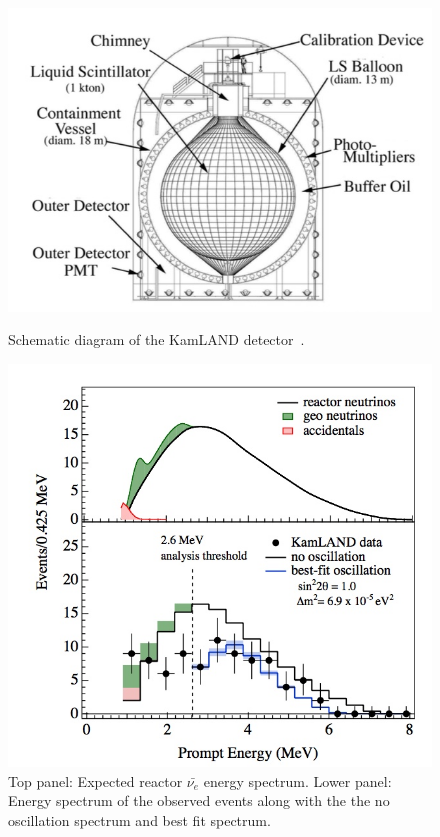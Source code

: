 \begin{figure}[h!]
  \centering
  \begin{minipage}[b]{0.49\textwidth}
    \includegraphics[width=\textwidth]{figures/KamLAND.jpeg}
    \vspace{2mm}
    \caption{Schematic diagram of the KamLAND detector~\cite{46KamLAND}.}
    \label{fig:KamLAND}
  \end{minipage}
  \hfill
  \begin{minipage}[b]{0.49\textwidth}
    \includegraphics[width=\textwidth]{figures/KamLAND2.jpeg}
       \vspace{2mm}
    \caption{Top panel: Expected reactor $\bar{\nu_e}$ energy spectrum. Lower panel: Energy spectrum of the observed events along with the the no oscillation spectrum and best fit spectrum. }
     \label{fig:KamLAND2}
  \end{minipage}
\end{figure}

